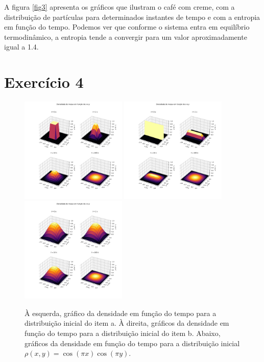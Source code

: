 \documentclass[a4paper, brazil]{article}
\begin{document}
A figura \ref{fig3} apresenta os gráficos que ilustram o café com creme, com a distribuição de partículas para determinados instantes de tempo e com a entropia em função do tempo.
Podemos ver que conforme o sistema entra em equilíbrio termodinâmico, a entropia tende a convergir para um valor aproximadamente igual a \num{1.4}.

\newpage
\section{Exercício 4}

\begin{figure}[ht]
\centering
\includegraphics[width=0.45\textwidth]{fig_4a.pdf}
\includegraphics[width=0.45\textwidth]{fig_4b.pdf}
\includegraphics[width=0.45\textwidth]{fig_4c.pdf}
\caption{À esquerda, gráfico da densidade em função do tempo para a distribuição inicial do item a. À direita, gráficos da densidade em função do tempo para a distribuição inicial do item b. Abaixo, gráficos da densidade em função do tempo para a distribuição inicial \( \rho (x, y) = \cos(\pi x) \cos(\pi y) \).}\label{fig4}
\end{figure}
\end{document}
